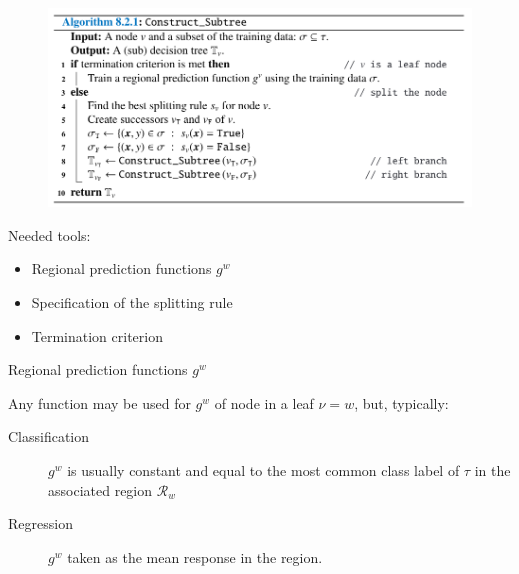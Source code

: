 \documentclass{beamer}
\begin{document}
\begin{frame}
    \label{Slide:topdown}
    \begin{figure}
        \includegraphics[width=0.7\linewidth]{A821Kroese}
    \end{figure}
    Needed tools:
    \begin{itemize}
        \item Regional prediction functions $g^{w}$
        \item Specification of the splitting rule 
        \item Termination criterion
    \end{itemize}
\end{frame}

\begin{frame}{Regional prediction functions $g^{w}$}
    
    Any function may be used for $g^{w}$ of node in a leaf $\nu=w$, but, typically:
    \begin{description}
        \item[Classification] $g^{w}$ is usually constant and equal to the most common class label of $\tau$ in the associated region $\mathcal{R}_w$
        \item[Regression] $g^{w}$ taken as the mean response in the region.
    \end{description}
\end{frame}
\end{document}
